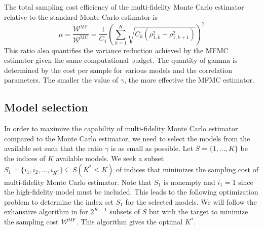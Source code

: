 \documentclass[final,3p,times,11pt]{elsarticle}
\begin{document}
The total sampling cost efficiency of the multi-fidelity Monte Carlo estimator relative to the standard Monte Carlo estimator is
\[
\mu = \frac{\mathcal{W}^\text{MF}}{\mathcal{W}^\text{MC}} = \frac{1}{C_1} \left(\sum_{k=1}^K\sqrt{C_k\left(\rho_{1,k}^2 - \rho_{1,k+1}^2\right)}\right)^2
\]
This ratio also quantifies the variance reduction achieved by the MFMC estimator given the same computational budget. The quantity of gamma is determined by the cost per sample for various models and the correlation parameters. The smaller the value of $\gamma$, the more effective the MFMC estimator.



\subsection{Model selection}
In order to maximize the capability of multi-fidelity Monte Carlo estimator  compared to the Monte Carlo estimator, we need to select the models from the available set such that the ratio $\gamma$ is as small as possible. Let $S=\{1, \ldots, K\}$ be the indices of $K$ available models. We seek a subset $S_1=\{i_1,i_2, \ldots,i_{K^*}\}\subseteq S (K^*\le K)$ of indices that minimizes the sampling cost of multi-fidelity Monte Carlo estimator. Note that $S_1$ is nonempty and $i_1=1$ since the high-fidelity model must be included. This leads to the following optimization problem to determine the index set $S_1$ for the selected models. We will follow the exhaustive algorithm in \cite[Algorithm~1]{PeWiGu:2016} for $2^{K-1}$ subsets of $S$ but with the target to minimize the sampling cost $\mathcal{W}^\text{MF}$. This algorithm gives the optimal $K^*$.
\end{document}
